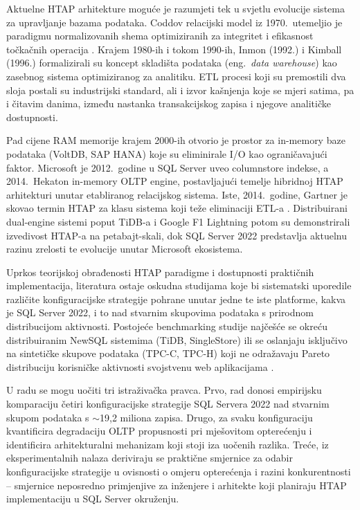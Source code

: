 Aktuelne HTAP arhitekture moguće je razumjeti tek u svjetlu evolucije sistema za upravljanje bazama podataka. Coddov relacijski model iz 1970.\ utemeljio je paradigmu normalizovanih shema optimiziranih za integritet i efikasnost točkačnih operacija \cite{ozcan2017htap}. Krajem 1980-ih i tokom 1990-ih, Inmon (1992.) i Kimball (1996.) formalizirali su koncept skladišta podataka (eng.\ \textit{data warehouse}) kao zasebnog sistema optimiziranog za analitiku. ETL procesi koji su premostili dva sloja postali su industrijski standard, ali i izvor kašnjenja koje se mjeri satima, pa i čitavim danima, između nastanka transakcijskog zapisa i njegove analitičke dostupnosti.

Pad cijene RAM memorije krajem 2000-ih otvorio je prostor za in-memory baze podataka (VoltDB, SAP HANA) koje su eliminirale I/O kao ograničavajući faktor. Microsoft je 2012.\ godine u SQL Server uveo columnstore indekse, a 2014.\ Hekaton in-memory OLTP engine, postavljajući temelje hibridnoj HTAP arhitekturi unutar etabliranog relacijskog sistema. Iste, 2014.\ godine, Gartner je skovao termin HTAP za klasu sistema koji teže eliminaciji ETL-a \cite{ozcan2017htap}. Distribuirani dual-engine sistemi poput TiDB-a \cite{huang2020tidb} i Google F1 Lightning \cite{yang2020f1} potom su demonstrirali izvedivost HTAP-a na petabajt-skali, dok SQL Server 2022 predstavlja aktuelnu razinu zrelosti te evolucije unutar Microsoft ekosistema.

Uprkos teorijskoj obrađenosti HTAP paradigme i dostupnosti praktičnih implementacija, literatura ostaje oskudna studijama koje bi sistematski uporedile različite konfiguracijske strategije pohrane unutar jedne te iste platforme, kakva je SQL Server 2022, i to nad stvarnim skupovima podataka s prirodnom distribucijom aktivnosti. Postojeće benchmarking studije najčešće se okreću distribuiranim NewSQL sistemima (TiDB, SingleStore) ili se oslanjaju isključivo na sintetičke skupove podataka (TPC-C, TPC-H) koji ne odražavaju Pareto distribuciju korisničke aktivnosti svojstvenu web aplikacijama \cite{zhang2024hybench}.

U radu se mogu uočiti tri istraživačka pravca. Prvo, rad donosi empirijsku komparaciju četiri konfiguracijske strategije SQL Servera 2022 nad stvarnim skupom podataka s $\sim$19,2 miliona zapisa. Drugo, za svaku konfiguraciju kvantificira degradaciju OLTP propusnosti pri mješovitom opterećenju i identificira arhitekturalni mehanizam koji stoji iza uočenih razlika. Treće, iz eksperimentalnih nalaza deriviraju se praktične smjernice za odabir konfiguracijske strategije u ovisnosti o omjeru opterećenja i razini konkurentnosti -- smjernice neposredno primjenjive za inženjere i arhitekte koji planiraju HTAP implementaciju u SQL Server okruženju.

